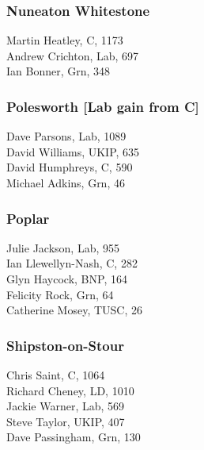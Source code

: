 \documentclass[a4paper,openany,10pt]{book}
\begin{document}
\subsubsection*{Nuneaton Whitestone}



Martin Heatley, C, 1173\\
Andrew Crichton, Lab, 697\\
Ian Bonner, Grn, 348\\


\subsubsection*{Polesworth \hspace*{\fill}\nolinebreak[1]%
\enspace\hspace*{\fill}
[Lab gain from C]}



Dave Parsons, Lab, 1089\\
David Williams, UKIP, 635\\
David Humphreys, C, 590\\
Michael Adkins, Grn, 46\\


\subsubsection*{Poplar}



Julie Jackson, Lab, 955\\
Ian Llewellyn-Nash, C, 282\\
Glyn Haycock, BNP, 164\\
Felicity Rock, Grn, 64\\
Catherine Mosey, TUSC, 26\\


\subsubsection*{Shipston-on-Stour}



Chris Saint, C, 1064\\
Richard Cheney, LD, 1010\\
Jackie Warner, Lab, 569\\
Steve Taylor, UKIP, 407\\
Dave Passingham, Grn, 130\\
\end{document}
